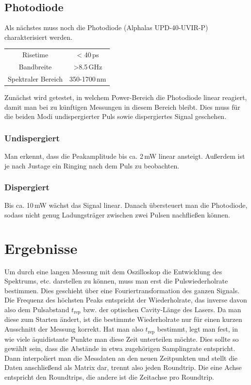 \documentclass[bachelor,       %
               twoside,        %
               BCOR10mm,       %
               english,ngerman, %
               ]{GAUBM}
\begin{document}
\section{Photodiode}
Als nächstes muss noch die Photodiode (Alphalas UPD-40-UVIR-P) charakterisiert werden.
\begin{table}[!htb]
	\centering
	\begin{tabular}{|c|c|}
		\hline
		Risetime & < 40\,ps \\
		Bandbreite & >8.5\,GHz \\
		Spektraler Bereich & 350-1700\,nm \\
		\hline	
	\end{tabular}
\end{table}
Zunächst wird getestet, in welchem Power-Bereich die Photodiode linear reagiert, damit man bei zu künftigen Messungen in diesem Bereich bleibt.
Dies muss für die beiden Modi undispergierter Puls sowie dispergiertes Signal geschehen.
\subsection{Undispergiert}
Man erkennt, dass die Peakamplitude bis ca. 2\,mW linear ansteigt.
Außerdem ist je nach Justage ein Ringing nach dem Puls zu beobachten.

\subsection{Dispergiert}
Bis ca. 10\,mW wächst das Signal linear.
Danach übersteuert man die Photodiode, sodass nicht genug Ladungsträger zwischen zwei Pulsen nachfließen können.

\chapter{Ergebnisse}
Um durch eine langen Messung mit dem Oszilloskop die Entwicklung des Spektrums, etc. darstellen zu können, muss man erst die Pulswiederholrate bestimmen.
Dies geschieht über eine Fouriertransformation des ganzen Signals.
Die Frequenz des höchsten Peaks entspricht der Wiederholrate, das inverse davon also dem Pulsabstand $t_\text{rep}$ bzw. der optischen Cavity-Länge des Lasers.
Da man diese zum Starten ändert, ist die bestimmte Wiederholrate nur für einen kurzen Ausschnitt der Messung korrekt.
Hat man also $t_\text{rep}$ bestimmt, legt man fest, in wie viele äquidistante Punkte man diese Zeit unterteilen möchte.
Dies sollte so gewählt sein, dass die Abstände in etwa zugehörigen Samplingrate entspricht.
Dann interpoliert man die Messdaten an den neuen Zeitpunkten und stellt die Daten anschließend als Matrix dar, trennt also jeden Roundtrip.
Die eine Achse entspricht den Roundtrips, die andere ist die Zeitachse pro Roundtrip.
\end{document}
